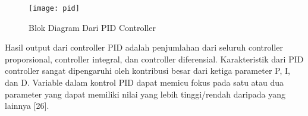 \begin{figure}[H]
	\centering
	\texttt{[image: pid]}
	\caption{Blok Diagram Dari PID Controller}
	\label{fig:pid}
\end{figure}

Hasil output dari controller PID adalah penjumlahan dari seluruh controller proporsional, controller integral, dan controller diferensial. Karakteristik dari PID controller sangat dipengaruhi oleh kontribusi besar dari ketiga parameter P, I, dan D. Variable dalam kontrol PID dapat memicu fokus pada satu atau dua parameter yang dapat memiliki nilai yang lebih tinggi/rendah daripada yang lainnya [26].
